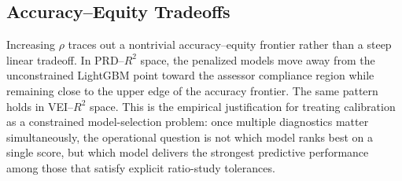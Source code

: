 \documentclass{article}
\theoremstyle{plain}
\theoremstyle{definition}
\newcommand{\1}{\mathbf{1}}
\begin{document}


\subsection{Accuracy--Equity Tradeoffs}

Increasing $\rho$ traces out a nontrivial accuracy--equity frontier rather than a steep linear tradeoff. In PRD--$R^2$ space, the penalized models move away from the unconstrained LightGBM point toward the assessor compliance region while remaining close to the upper edge of the accuracy frontier. The same pattern holds in VEI--$R^2$ space. This is the empirical justification for treating calibration as a constrained model-selection problem: once multiple diagnostics matter simultaneously, the operational question is not which model ranks best on a single score, but which model delivers the strongest predictive performance among those that satisfy explicit ratio-study tolerances.
\end{document}
